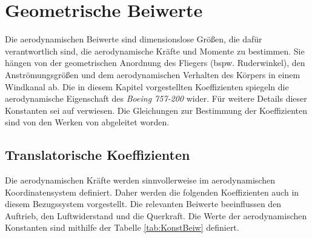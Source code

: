\section{Geometrische Beiwerte}
\label{sec:Beiwerte}
Die aerodynamischen Beiwerte sind dimensionslose Grö{\ss}en, die dafür verantwortlich sind, die aerodynamische Kräfte und Momente zu bestimmen. Sie hängen von der geometrischen Anordnung des Fliegers (bspw. Ruderwinkel), den Anströmungsgrö{\ss}en und dem aerodynamischen Verhalten des Körpers in einem Windkanal ab. Die in diesem Kapitel vorgestellten Koeffizienten spiegeln die aerodynamische Eigenschaft des \textit{Boeing 757-200} wider. Für weitere Details dieser Konstanten sei auf \cite{AircraftCS,RAMPaper,RAMYoutube_Playlist} verwiesen. Die Gleichungen zur Bestimmung der Koeffizienten sind von den Werken von \cite{FlugmechanikBuch,FM1Skrypt} abgeleitet worden. 

\subsection{Translatorische Koeffizienten}
Die aerodynamischen Kräfte werden sinnvollerweise im aerodynamischen Koordinatensystem definiert. Daher werden die folgenden Koeffizienten auch in diesem Bezugssystem vorgestellt. Die relevanten Beiwerte beeinflussen den Auftrieb, den Luftwiderstand und die Querkraft. Die Werte der aerodynamischen Konstanten sind mithilfe der Tabelle \ref{tab:KonstBeiw} definiert. 

